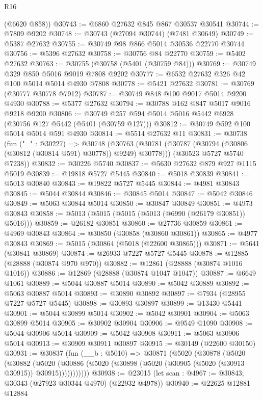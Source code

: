 \begin{lexlean}{R16}
\begin{coremodule}
      (@6620 @858))
@30743 := @6860 @27632 @845 @867 @30537 @30541
@30744 := @7809 @9202
@30748 := @30743 (@27094 @30744) (@7481 @30649)
@30749 := @5387 @27632
@30755 := @30749 @98 @866 @5014 @30536 @22770 @30744
@30756 := @5396 @27632
@30758 := @30756 @84 @22770
@30759 := @5402 @27632
@30763 := @30755 (@30758 (@5401 (@30759 @84)))
@30769 := @30749 @329 @850 @5016 @9019 @7808 @9202
@30777 := @6532 @27632 @326 @42 @100 @5014 @5014 @4930 @7808
@30778 := @5421 @27632
@30781 := @30769 (@30777 @30778 @7912)
@30787 := @30749 @848 @100 @9017 @5014 @9200 @4930
@30788 := @5377 @27632
@30794 := @30788 @162 @847 @5017 @9016 @9218 @9200
@30806 := @30749 @257 @594 @5014 @5016 @5442 @6928 (@30756 @127 @5442 (@5401 (@30759 @127)))
@30812 := @30749 @592 @100 @5014 @5014 @591 @4930
@30814 := @5514 @27632 @11
@30831 := @30738
    (fun ("_" : @30227) =>
    @30748
      (@30763 (@30781 (@30787 (@30794 (@30806 (@30812 (@30814 @591) @30778)) @9249) @30778)))
      (@30523 @5727 @5740 @7238))
@30832 := @30226 @5740
@30837 := @5630 @27632 @879 @927 @1115 @5019
@30839 := @19818 @5727 @5445
@30840 := @5018 @30839
@30841 := @5013 @30840
@30843 := @19822 @5727 @5445
@30844 := @4981 @30843
@30845 := @5044 @30844
@30846 := @30845 @5014
@30847 := @5042 @30846
@30849 := @5063 @30844 @5014
@30850 := @30847 @30849
@30851 := @4973 @30843
@30858 := @5013 (@5015 (@5015 (@5013 (@6990 (@26179 @30851)) @5016)))
@30859 := @26182 @30851
@30860 := @27736 @30859
@30861 := @4969 @30843
@30864 := @30850 (@30858 (@30860 @30861))
@30865 := @4977 @30843
@30869 := @5015 (@30864 (@5018 (@22600 @30865)))
@30871 := @5641 (@30841 @30869)
@30874 := @26933 @7227 @5727 @5445
@30878 := @12885 (@28888 (@30874 @970 @970))
@30882 := @12861 (@28888 (@30874 @1016 @1016))
@30886 := @12869 (@28888 (@30874 @1047 @1047))
@30887 := @6649 @1061
@30889 := @5044 @30887 @5014
@30890 := @5042 @30889
@30892 := @5063 @30887 @5014
@30893 := @30890 @30892
@30897 := @7934 (@28955 @7227 @5727 @5445)
@30898 := @30893 @30897
@30899 := @13430 @5441
@30901 := @5044 @30899 @5014
@30902 := @5042 @30901
@30904 := @5063 @30899 @5014
@30905 := @30902 @30904
@30906 := @9549 @1090
@30908 := @5044 @30906 @5014
@30909 := @5042 @30908
@30911 := @5063 @30906 @5014
@30913 := @30909 @30911 @30897
@30915 := @30149 (@22600 @30150)
@30931 := @30837
    (fun (__b : @5010) =>
    @30871
      (@5020
        (@30878
          (@5020
            (@30882
              (@5020 (@30886 (@5020 (@30898 (@5020 (@30905 (@5020 (@30913 @30915)) @30915)))))))))))
@30938 := @23015 (let scan : @4967 := @30843; @30343 (@27923 @30344 @4970) (@22932 @4978))
@30940 := @22625 @12881 @12884

\end{coremodule}
\end{lexlean}
